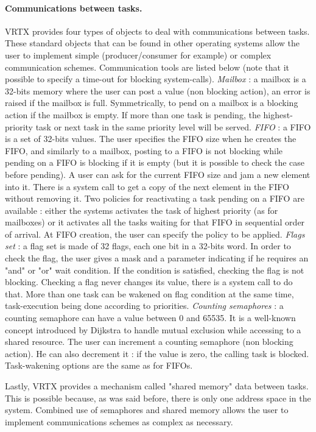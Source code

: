 \documentclass[10pt]{report}
\begin{document}
\paragraph{Communications between tasks.} VRTX provides four types of objects to deal with communications
between tasks. These standard objects that can be found in other
operating systems allow the user to implement simple
(producer/consumer for example) or complex communication schemes.
Communication tools are listed below (note that it possible to
specify a time-out for blocking system-calls). {\em Mailbox} : a
mailbox is a 32-bits memory where the user can post a value (non
blocking action), an error is raised if the mailbox is full.
Symmetrically, to pend on a mailbox is a blocking action if the
mailbox is empty. If more than one task is pending, the
highest-priority task or next task in the same priority level
will be served. {\em FIFO} :
a FIFO is a set of 32-bits values. The
user specifies the FIFO size when he creates the FIFO, and
similarly to a mailbox, posting to a FIFO is not blocking while
pending on a FIFO is blocking if it is empty (but it is possible
to check the case before pending). A user can ask for the current
FIFO size and jam a new element into it. There is a system call
to get a copy of the next element in the FIFO without removing
it. Two policies for reactivating a task pending on a FIFO are
available : either the systems activates the task of highest
priority (as for mailboxes) or it activates all the tasks waiting
for that FIFO in sequential order of arrival. At FIFO creation,
the user can specify the policy to be applied. {\em Flags set} : a
flag set is made of 32 flags, each one bit in a 32-bits word. In
order to check the flag, the user gives a mask and a parameter
indicating if he requires an "and" or "or" wait condition. If the
condition is satisfied, checking the flag is not blocking.
Checking a flag never changes its value, there is a system call
to do that. More than one task can be wakened on flag condition
at the same time, task-execution being done according to
priorities. {\em Counting semaphores} : a counting semaphore can have
a value between 0 and 65535. It is a well-known concept
introduced by Dijkstra to handle mutual exclusion while accessing
to a shared resource. The user can increment a counting semaphore
(non blocking action). He can also decrement it : if the value is
zero, the calling task is blocked. Task-wakening options are the
same as for FIFOs.

Lastly, VRTX provides a mechanism called "shared memory"
data between tasks. This is possible because, as was said before,
there is only one address space in the system. Combined use of
semaphores and shared memory allows the user to implement
communications schemes as complex as necessary.
\end{document}
